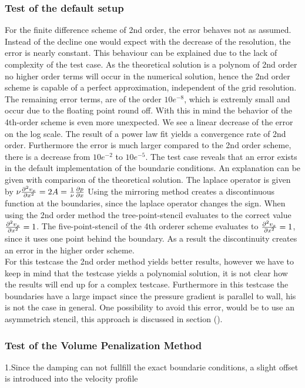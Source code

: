 \subsubsection{Test of the default setup}
For the finite difference scheme of 2nd order, the error behaves not as assumed.
Instead of the decline one would expect with the decrease of the resolution, the  error is nearly constant.
This behaviour can be explained due to the lack of complexity of the test case.
 As the theoretical solution is a polynom of 2nd order
no higher order terms will occur in the numerical solution, hence the
 2nd order scheme is capable of a perfect approximation, independent of the
grid resolution. The remaining error terms, are of the order $10e^{-8}$,
 which is extremly small and occur due to the floating point round off.
With this in mind the behavior of the 4th-order scheme is even more unexpected.
We see a linear decrease of the error on the log scale.
The result of a power law fit yields a convergence rate of 2nd order.
Furthermore the error is much larger compared to the 2nd order scheme,
 there is a decrease from $10e^{-2}$ to $10e^{-5}$.
The test case reveals that an error exists in the default implementation of the boundarie conditions.
An explanation can be given with comparison of the theoretical solution. The laplace operator is given by
 $ \nu \pdn[^2 v_x]{x^2} = 2A = \frac{1}{\nu}\pdn[p]{x}$
Using the mirroring method creates a discontinuous function at the boundaries, since the laplace operator changes the sign.
When using the 2nd order method the tree-point-stencil evaluates to the correct value $\pdn[^2 v_x]{x^2} = 1$.
The five-point-stencil of the 4th orderer scheme evaluates to $\pdn[^2 v_x]{x^2} = 1$, since it uses one point behind the boundary.
As a result the discontinuity creates an error in the higher order scheme.\\
For this testcase the 2nd order method yields better results, however we
have to keep in mind that the testcase yields a polynomial solution,
it is not clear how the results will end up for a complex testcase.
Furthermore in this testcase the boundaries have a large impact since the pressure gradient is parallel to wall,
his is not the case in general.
One possibility to avoid this error, would be to use an asymmetrich stencil, this approach is discussed in section ().

\subsubsection{Test of the Volume Penalization Method}
1.Since the damping can not fullfill the exact boundarie conditions, a slight offset is introduced into the velocity profile\\

